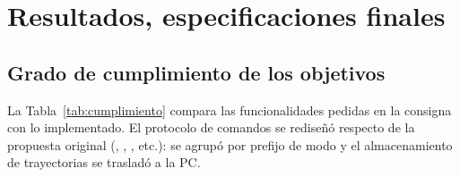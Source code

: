 \section{Resultados, especificaciones finales}\label{sec:resultados}

\subsection{Grado de cumplimiento de los objetivos}
La Tabla~\ref{tab:cumplimiento} compara las funcionalidades pedidas en la consigna con lo
implementado. El protocolo de comandos se rediseñó respecto de la propuesta original
(, , , etc.): se agrupó por prefijo de modo y el almacenamiento
de trayectorias se trasladó a la PC.

